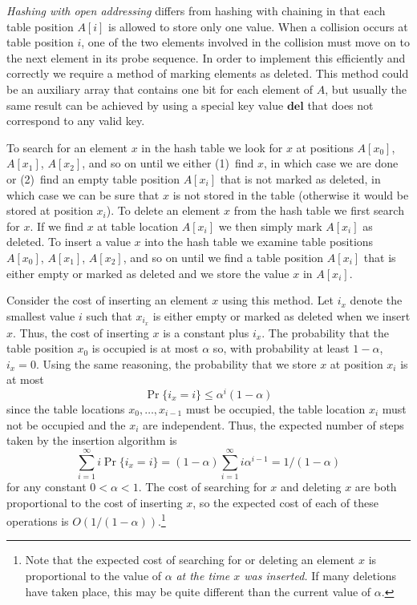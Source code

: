 \label{hash:sec:open-addressing}

\emph{Hashing with open addressing} differs from hashing with chaining in
that each table position $A[i]$ is allowed to store only one value.
When a collision occurs at table position $i$, one of the two elements
involved in the collision must move on to the next element in its
probe sequence.  In order to implement this efficiently and correctly
we require a method of marking elements as deleted.  This method could
be an auxiliary array that contains one bit for each element of $A$,
but usually the same result can be achieved by using a special key
value $\mathbf{del}$ that does not correspond to any valid key.

To search for an element $x$ in the hash table we look for $x$ at
positions $A[x_0]$, $A[x_1]$, $A[x_2]$, and so on until we either
(1)~find $x$, in which case we are done or (2)~find an empty table
position $A[x_i]$ that is not marked as deleted, in which case we can
be sure that $x$ is not stored in the table (otherwise it would be
stored at position $x_i$).  To delete an element $x$ from the hash
table we first search for $x$.  If we find $x$ at table location
$A[x_i]$ we then simply mark $A[x_i]$ as deleted.  To insert a value
$x$ into the hash table we examine table positions $A[x_0]$, $A[x_1]$,
$A[x_2]$, and so on until we find a table position $A[x_i]$ that is
either empty or marked as deleted and we store the value $x$ in
$A[x_i]$.

Consider the cost of inserting an element $x$ using this method.  Let
$i_x$ denote the smallest value $i$ such that $x_{i_x}$ is either empty or
marked as deleted when we insert $x$.  Thus, the cost of inserting $x$
is a constant plus $i_x$.  The probability that the table position
$x_0$ is occupied is at most $\alpha$ so, with probability at least
$1-\alpha$, $i_x=0$.  Using the same reasoning, the probability
that we store $x$ at position $x_i$ is at most 
\begin{equation}
   \Pr\{i_x = i\} \le \alpha^{i}(1-\alpha)  \label{hash:eq:pro}
\end{equation}
since the table locations $x_0,\ldots,x_{i-1}$ must be occupied,
the table location $x_i$ must not be occupied and the $x_i$ are
independent.  Thus, the expected number of steps taken by the
insertion algorithm is 
\[
   \sum_{i=1}^\infty i\Pr\{i_x = i\} = (1-\alpha)\sum_{i=1}^\infty i\alpha^{i-1}  = 1/(1-\alpha)
\]
for any constant $0<\alpha< 1$.  The cost of searching for $x$ and
deleting $x$ are both proportional to the cost of inserting $x$, so
the expected cost of each of these operations is
$O(1/(1-\alpha))$.\footnote{Note that the expected cost of searching
for or deleting an
element $x$ is proportional to the value of $\alpha$ \emph{at the time
$x$ was inserted.}  If many deletions have taken place, this may be
quite different than the current value of $\alpha$.}   

